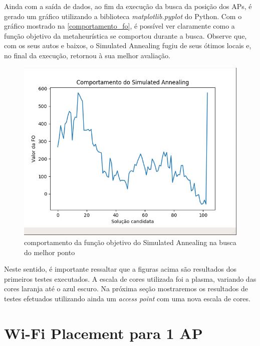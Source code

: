 \documentclass[
	12pt,				%
	openright,			%
	twoside,			%
	a4paper,			%
	english,			%
	french,				%
	spanish,			%
	brazil				%
	]{abntex2}
\begin{document}
Ainda com a saída de dados, ao fim da execução da busca da posição dos APs, é gerado um gráfico utilizando a biblioteca \textit{matplotlib.pyplot} do Python. Com o gráfico mostrado na \autoref{comportamento_fo}, é possível ver claramente como a função objetivo da metaheurística se comportou durante a busca. Observe que, com os seus autos e baixos, o Simulated Annealing fugiu de seus ótimos locais e, no final da execução, retornou à sua melhor avaliação.
	
\begin{figure}[ht]
	\caption{\label{comportamento_fo}comportamento da função objetivo do Simulated Annealing na busca do melhor ponto}
	\begin{center}
		\includegraphics[scale=0.5]{images/comportamento-fo.jpg}
	\end{center}
\end{figure}


Neste sentido, é importante ressaltar que a figuras acima são resultados dos primeiros testes executados. A escala de cores utilizada foi a plasma, variando das cores laranja até o azul escuro. Na próxima seção mostraremos os resultados de testes efetuados utilizando ainda um \textit{access point} com uma nova escala de cores. 

\clearpage

\section[Wi-Fi Placement para 1 AP]{Wi-Fi Placement para 1 AP}
\end{document}

